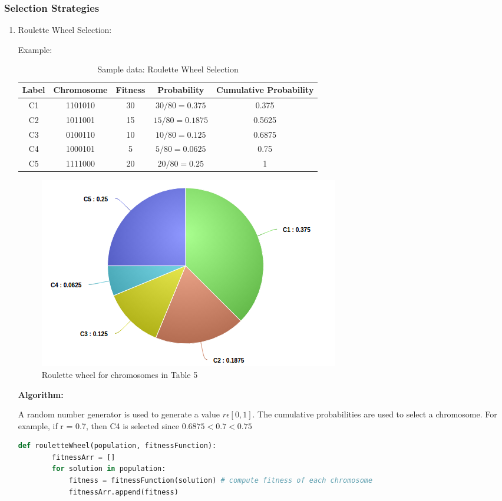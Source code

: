 \documentclass[12pt,a4paper]{article}
\begin{document}
	\subsubsection{Selection Strategies}
	\begin{enumerate}
	\item Roulette Wheel Selection: \par
	Example: \\
	\begin{table}[H]
		\centering
		\caption{Sample data: Roulette Wheel Selection}
		\begin{tabular}{ |c|c|c|c|c| }
		\hline
		Label & Chromosome & Fitness & Probability & Cumulative Probability \\
		\hline
		\hline
		C1 & 1101010 & 30 & $30/80=0.375$ & 0.375 \\
		\hline
		C2 & 1011001 & 15 & $15/80=0.1875$ & 0.5625 \\
		\hline
		C3 & 0100110 & 10 & $10/80=0.125$ & 0.6875 \\
		\hline
		C4 & 1000101 & 5 & $5/80=0.0625$ & 0.75 \\
		\hline
		C5 & 1111000 & 20 & $20/80=0.25$ & 1 \\
		\hline
		\end{tabular}
	\end{table}	
	
	\begin{figure}[h]
		\includegraphics[width=\textwidth]{roulette-pie}
		\caption{Roulette wheel for chromosomes in Table 5}
		\centering
	\end{figure}

	
	\textbf{Algorithm:}\par
	A random number generator is used to generate a value $r \epsilon [0,1]$. The cumulative probabilities are used to select a chromosome. For example, if r = 0.7, then C4 is selected since $0.6875 < 0.7 < 0.75$
	\vspace{5mm}
	\begin{lstlisting}[language=Python]
    def rouletteWheel(population, fitnessFunction):
        fitnessArr = []
        for solution in population:
            fitness = fitnessFunction(solution) # compute fitness of each chromosome
            fitnessArr.append(fitness)
        

\end{lstlisting}
\end{enumerate}
\end{document}
